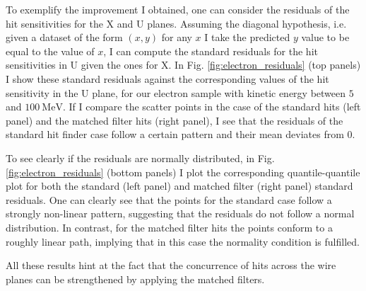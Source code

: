To exemplify the improvement I obtained, one can consider the residuals of the hit sensitivities for the X and U planes. Assuming the diagonal hypothesis, i.e. given a dataset of the form $(x, y)$ for any $x$ I take the predicted $y$ value to be equal to the value of $x$, I can compute the standard residuals for the hit sensitivities in U given the ones for X. In Fig. \ref{fig:electron_residuals} (top panels) I show these standard residuals against the corresponding values of the hit sensitivity in the U plane, for our electron sample with kinetic energy between $5$ and $100 \ \mathrm{MeV}$. If I compare the scatter points in the case of the standard hits (left panel) and the matched filter hits (right panel), I see that the residuals of the standard hit finder case follow a certain pattern and their mean deviates from $0$.

To see clearly if the residuals are normally distributed, in Fig. \ref{fig:electron_residuals} (bottom panels) I plot the corresponding quantile-quantile plot for both the standard (left panel) and matched filter (right panel) standard residuals. One can clearly see that the points for the standard case follow a strongly non-linear pattern, suggesting that the residuals do not follow a normal distribution. In contrast, for the matched filter hits the points conform to a roughly linear path, implying that in this case the normality condition is fulfilled.

All these results hint at the fact that the concurrence of hits across the wire planes can be strengthened by applying the matched filters.